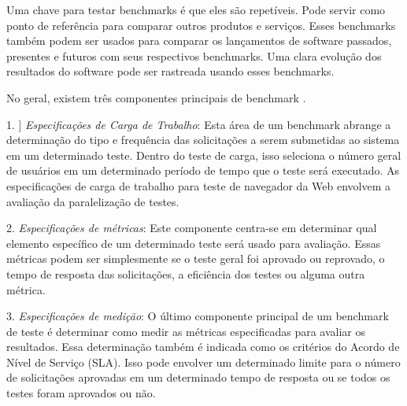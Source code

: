 \begin{tabela}[h]
\begin{tabela}[!t]
\begin{tabela}[h]
\begin{tabela}[h]
Uma chave para testar benchmarks é que eles são repetíveis. Pode servir como ponto de referência para comparar outros produtos e serviços. Esses benchmarks também podem ser usados para comparar os lançamentos de software passados, presentes e futuros com seus respectivos benchmarks. Uma clara evolução dos resultados do software pode ser rastreada usando esses benchmarks.




No geral, existem três componentes principais de benchmark \cite{benchmark_info}.
\begin{itemizar}
     \item 1. ] \textit{Especificações de Carga de Trabalho}: Esta área de um benchmark abrange a determinação do tipo e frequência das solicitações a serem submetidas ao sistema em um determinado teste. Dentro do teste de carga, isso seleciona o número geral de usuários em um determinado período de tempo que o teste será executado. As especificações de carga de trabalho para teste de navegador da Web envolvem a avaliação da paralelização de testes.
    
     \item[2. ] \textit{Especificações de métricas}: Este componente centra-se em determinar qual elemento específico de um determinado teste será usado para avaliação. Essas métricas podem ser simplesmente se o teste geral foi aprovado ou reprovado, o tempo de resposta das solicitações, a eficiência dos testes ou alguma outra métrica.
    
     \item[3. ] \textit{Especificações de medição}: O último componente principal de um benchmark de teste é determinar como medir as métricas especificadas para avaliar os resultados. Essa determinação também é indicada como os critérios do Acordo de Nível de Serviço (SLA). Isso pode envolver um determinado limite para o número de solicitações aprovadas em um determinado tempo de resposta ou se todos os testes foram aprovados ou não.
    

\end{itemizar}
\end{tabela}
\end{tabela}
\end{tabela}
\end{tabela}
